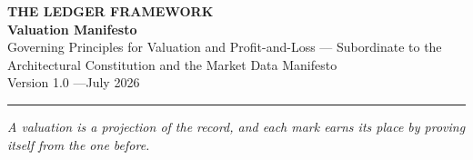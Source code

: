 \documentclass[11pt,a4paper]{article}
\begin{document}
\begin{center}
  {\LARGE\bfseries THE LEDGER FRAMEWORK}\\[0.9em]
  {\large\bfseries Valuation Manifesto}\\[0.6em]
  {\normalsize Governing Principles for Valuation and Profit-and-Loss ---
   Subordinate to the Architectural Constitution and the Market Data
   Manifesto}\\[1.4em]
  Version 1.0 \quad---\quad July 2026
\end{center}

\vspace{0.6em}
\begin{center}\rule{0.35\linewidth}{0.4pt}\end{center}
\vspace{0.6em}

\begin{center}\itshape
A valuation is a projection of the record, and each mark earns its place
by proving itself from the one before.
\end{center}

\vspace{0.4em}
\end{document}
